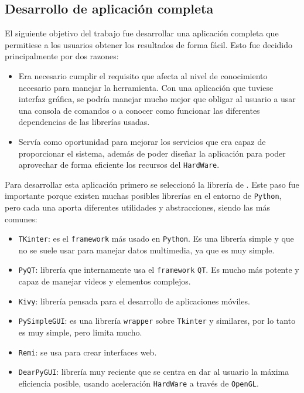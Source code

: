 \subsection{Desarrollo de aplicación completa}

El siguiente objetivo del trabajo fue desarrollar una aplicación completa que permitiese a los usuarios obtener los resultados de forma fácil. Esto fue decidido principalmente por dos razones:

\begin{itemize}
    \item Era necesario cumplir el requisito que afecta al nivel de conocimiento necesario para manejar la herramienta. Con una aplicación que tuviese interfaz gráfica, se podría manejar mucho mejor que 
    obligar al usuario a usar una consola de comandos o a conocer como funcionar las diferentes dependencias de las librerías usadas.
    \item Servía como oportunidad para mejorar los servicios que era capaz de proporcionar el sistema, además de poder diseñar la aplicación para poder aprovechar de forma eficiente los recursos del 
    \texttt{HardWare}.
\end{itemize}

Para desarrollar esta aplicación primero se seleccionó la librería de . Este paso fue importante porque existen muchas posibles librerías en el entorno de \texttt{Python}, pero cada una 
aporta diferentes utilidades y abstracciones, siendo las más comunes:
\begin{itemize}
    \item \texttt{TKinter}: es el \texttt{framework} más usado en \texttt{Python}. Es una librería simple y que no se suele usar para manejar datos multimedia, ya que es muy simple.
    \item \texttt{PyQT}: librería que internamente usa el \texttt{framework} \texttt{QT}. Es mucho más potente y capaz de manejar videos y elementos complejos.
    \item \texttt{Kivy}: librería pensada para el desarrollo de aplicaciones móviles.
    \item \texttt{PySimpleGUI}: es una librería \texttt{wrapper} sobre \texttt{Tkinter} y similares, por lo tanto es muy simple, pero limita mucho.
    \item \texttt{Remi}: se usa para crear interfaces web.
    \item \texttt{DearPyGUI}\cite{HoffstadtDearPyGuiDear}: librería muy reciente que se centra en dar al usuario la máxima eficiencia posible, usando aceleración \texttt{HardWare} a través de \texttt{OpenGL}.
\end{itemize}

